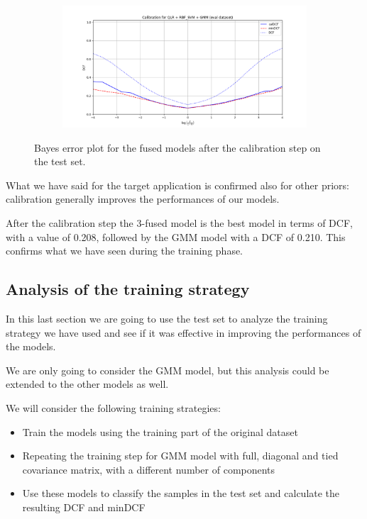 \documentclass[12pt]{report}
\newcommand{\nnl}{%
    \newline
    \newline
}
\newcommand{\nl}{%
    \newline
    \noindent
}
\begin{document}
\begin{figure}[H]
\begin{subfigure}[t]{0.49\textwidth}
    \end{subfigure}
    \hfill
    \begin{subfigure}[t]{0.49\textwidth}
        \includegraphics[width=\textwidth]{./plot/eval/eval_calib_QLR_RBF_SVM_GMM.png}
    \end{subfigure}

    \caption{Bayes error plot for the fused models after the calibration step on the test set.}
    \label{fig:calibration_models_fused}
\end{figure}
\noindent
What we have said for the target application is confirmed also for other priors: calibration generally improves the performances of our models.
\nnl
After the calibration step the 3-fused model is the best model in terms of DCF, with a value of 0.208, followed by the GMM model with a DCF of 0.210. This confirms what we have seen during the training phase.

\subsection*{Analysis of the training strategy}
In this last section we are going to use the test set to analyze the training strategy we have used and see if it was effective in improving the performances of the models.
\nl
We are only going to consider the GMM model, but this analysis could be extended to the other models as well.
\nnl
We will consider the following training strategies:
\begin{itemize}
    \item Train the models using the training part of the original dataset
    \item Repeating the training step for GMM model with full, diagonal and tied covariance matrix, with a different number of components
    \item Use these models to classify the samples in the test set and calculate the resulting DCF and minDCF
\end{itemize}
\end{document}

